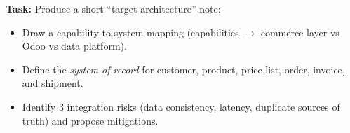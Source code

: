 \textbf{Task:} Produce a short ``target architecture'' note:
\begin{itemize}
  \item Draw a capability-to-system mapping (capabilities $\rightarrow$ commerce layer vs Odoo vs data platform).
  \item Define the \emph{system of record} for customer, product, price list, order, invoice, and shipment.
  \item Identify 3 integration risks (data consistency, latency, duplicate sources of truth) and propose mitigations.
\end{itemize}
